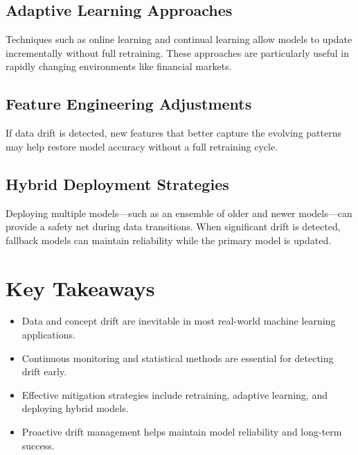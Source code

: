 \documentclass[12pt,openany, draft]{book}
\begin{document}
\subsection{Adaptive Learning Approaches}
Techniques such as online learning and continual learning allow models to update incrementally without full retraining. These approaches are particularly useful in rapidly changing environments like financial markets.


\subsection{Feature Engineering Adjustments}
If data drift is detected, new features that better capture the evolving patterns may help restore model accuracy without a full retraining cycle.


\subsection{Hybrid Deployment Strategies}
Deploying multiple models—such as an ensemble of older and newer models—can provide a safety net during data transitions. When significant drift is detected, fallback models can maintain reliability while the primary model is updated.



\section{Key Takeaways}

\begin{itemize}
    \item Data and concept drift are inevitable in most real-world machine learning applications.
    \item Continuous monitoring and statistical methods are essential for detecting drift early.
    \item Effective mitigation strategies include retraining, adaptive learning, and deploying hybrid models.
    \item Proactive drift management helps maintain model reliability and long-term success.
\end{itemize}



\newpage
\thispagestyle{empty}
\end{document}
